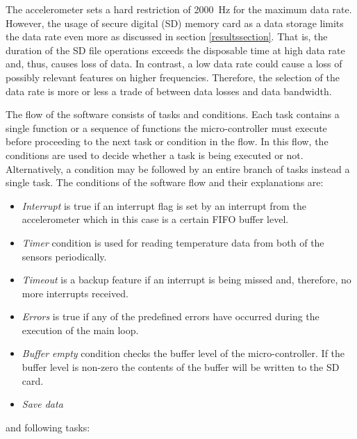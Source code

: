 \documentclass[english,12pt,a4paper,pdftex,elec,utf8]{aaltothesis}
\begin{document}
The accelerometer sets a hard restriction of \SI{2000}{\hertz} for the maximum data rate. However, the usage of secure digital (SD) memory card as a data storage limits the data rate even more as discussed in section \ref{resultssection}. That is, the duration of the SD file operations exceeds the disposable time at high data rate and, thus, causes loss of data. In contrast, a low data rate could cause a loss of possibly relevant features on higher frequencies. Therefore, the selection of the data rate is more or less a trade of between data losses and data bandwidth.

The flow of the software consists of tasks and conditions. Each task contains a single function or a sequence of functions the micro-controller must execute before proceeding to the next task or condition in the flow. In this flow, the conditions are used to decide whether a task is being executed or not. Alternatively, a condition may be followed by an entire branch of tasks instead a single task. The conditions of the software flow and their explanations are:

\begin{itemize}
\item \textit{Interrupt} is true if an interrupt flag is set by an interrupt from the accelerometer which in this case is a certain FIFO buffer level.
\item \textit{Timer} condition is used for reading temperature data from both of the sensors periodically.

\item \textit{Timeout}  is a backup feature if an interrupt is being missed and, therefore, no more interrupts received.

\item \textit{Errors}  is true if any of the predefined errors have occurred during the execution of  the main loop.

\item \textit{Buffer empty} condition checks the buffer level of the micro-controller. If the buffer level is non-zero the contents of the buffer will be written to the SD card.

\item \textit{Save data}

\end{itemize}
and following tasks:
\end{document}
